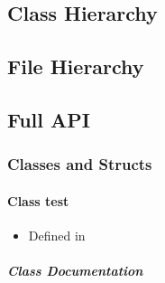 \documentclass[letterpaper,10pt,english]{sphinxmanual}
\begin{document}
\subsection{Class Hierarchy}
\label{\detokenize{api/library_root:class-hierarchy}}



\subsection{File Hierarchy}
\label{\detokenize{api/library_root:file-hierarchy}}



\subsection{Full API}
\label{\detokenize{api/library_root:full-api}}

\subsubsection{Classes and Structs}
\label{\detokenize{api/library_root:classes-and-structs}}
\sphinxstepscope


\paragraph{Class test}
\label{\detokenize{api/classtest:class-test}}\label{\detokenize{api/classtest:exhale-class-classtest}}\label{\detokenize{api/classtest::doc}}\begin{itemize}
\item {} 
\sphinxAtStartPar
Defined in 

\end{itemize}


\subparagraph{Class Documentation}
\label{\detokenize{api/classtest:class-documentation}}
\end{document}
